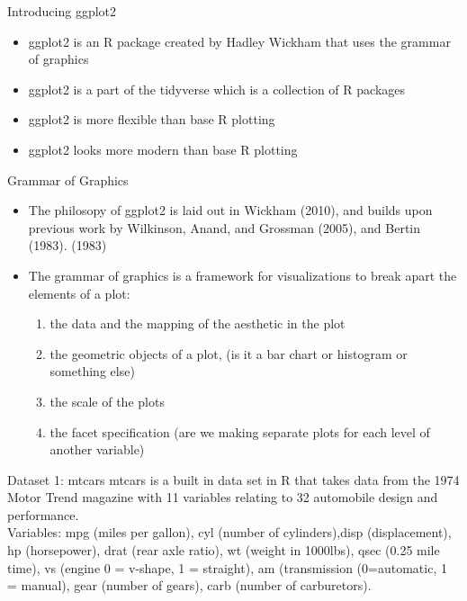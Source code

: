 \documentclass{beamer}\usepackage[]{graphicx}\usepackage[]{xcolor}
\begin{document}
\begin{frame}{Introducing ggplot2}
\begin{itemize}
\item ggplot2 is an R package created by Hadley Wickham that uses the grammar of graphics
\item ggplot2 is a part of the tidyverse which is a collection of R packages
\item ggplot2 is more flexible than base R plotting
\item ggplot2 looks more modern than base R plotting
\end{itemize}

\end{frame}


\begin{frame}{Grammar of Graphics}
\begin{itemize}
\item The philosopy of ggplot2 is laid out in Wickham (2010), and builds upon previous work by Wilkinson, Anand, and Grossman (2005), and Bertin (1983).
(1983)
\item The grammar of graphics is a framework for visualizations to break apart the elements of a plot:
\begin{enumerate}
\item the data and the mapping of the aesthetic in the plot
\item the geometric objects of a plot,  (is it a bar chart or histogram or something else)
\item the scale of the plots
\item the facet specification (are we making separate plots for each level of another variable)
\end{enumerate}
\end{itemize}

\end{frame}




\begin{frame}{Dataset 1: mtcars}
mtcars is a built in data set in R that takes data from the 1974 Motor Trend magazine with 11 variables relating to 32 automobile design and performance.  \\
Variables: mpg (miles per gallon), cyl (number of cylinders),disp (displacement), hp (horsepower), drat (rear axle ratio), wt (weight in 1000lbs), qsec (0.25 mile time), vs (engine 0 = v-shape, 1 = straight), am (transmission (0=automatic, 1 = manual), gear (number of gears), carb (number of carburetors).
\end{frame}
\end{document}
